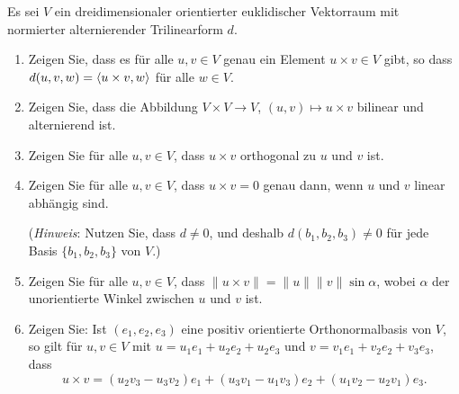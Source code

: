 \begin{question}[subtitle = Konstruktion und Eigenschaften des Kreuzprodukts]{3}
  Es sei $V$ ein dreidimensionaler orientierter euklidischer Vektorraum mit normierter alternierender Trilinearform $d$.
  \begin{enumerate}[leftmargin=*]
    \item
      Zeigen Sie, dass es für alle $u, v \in V$ genau ein Element $u \times v \in V$ gibt, so dass $d(u,v,w) = \left\langle u \times v, w \right\rangle$ für alle $w \in V$.
    \item
      Zeigen Sie, dass die Abbildung $V \times V \to V$, $(u,v) \mapsto u \times v$ bilinear und alternierend ist.
    \item
      Zeigen Sie für alle $u, v \in V$, dass $u \times v$ orthogonal zu $u$ und $v$ ist.
    \item
      Zeigen Sie für alle $u, v \in V$, dass $u \times v = 0$ genau dann, wenn $u$ und $v$ linear abhängig sind.
      
      (\emph{Hinweis}:
       Nutzen Sie, dass $d \neq 0$, und deshalb $d(b_1, b_2, b_3) \neq 0$ für jede Basis $\{b_1, b_2, b_3\}$ von $V$.)
    \item
      Zeigen Sie für alle $u, v \in V$, dass $\|u \times v\| = \|u\| \|v\| \sin \alpha$, wobei $\alpha$ der unorientierte Winkel zwischen $u$ und $v$ ist.
    \item
      Zeigen Sie:
      Ist $(e_1, e_2, e_3)$ eine positiv orientierte Orthonormalbasis von $V$, so gilt für $u, v \in V$ mit $u = u_1 e_1 + u_2 e_2 + u_2 e_3$ und $v = v_1 e_1 + v_2 e_2 + v_3 e_3$, dass
      \[
        u \times v = (u_2 v_3 - u_3 v_2) e_1 + (u_3 v_1 - u_1 v_3) e_2 + (u_1 v_2 - u_2 v_1) e_3.
      \]
  \end{enumerate}
\end{question}

















